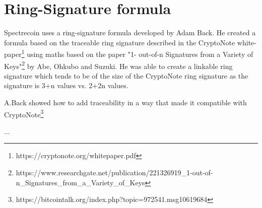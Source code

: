 \section{Ring-Signature formula}
Spectrecoin uses a ring-signature formula developed by Adam Back. He created a formula based on the 
traceable ring signature described in the CryptoNote white-paper\footnote{https://cryptonote.org/whitepaper.pdf} using maths based on the paper "1-
out-of-n Signatures from a Variety of Keys"\footnote{https://www.researchgate.net/publication/221326919\_1-out-of-n\_Signatures\_from\_a\_Variety\_of\_Keys} by Abe, Ohkubo and Suzuki. He was able to create a linkable ring signature which tends to be  of the size of the CryptoNote ring signature as the signature is 3+n 
values vs. 2+2n values.  

 

A.Back showed how to add traceability in a way that made it compatible with CryptoNote\footnote{https://bitcointalk.org/index.php?topic=972541.msg10619684}

...